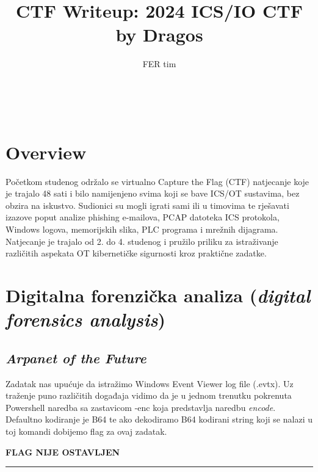 \documentclass{article}
\title{CTF Writeup: \textbf{2024 ICS/IO CTF by Dragos}}
\author{FER tim}
\begin{document}
\begin{center}
    \vspace*{\fill}
    {\LARGE\bf\thetitle}\\[1.5em]
    {\large\theauthor}
    \vspace*{\fill}
\end{center}

\newpage
\tableofcontents
\newpage

\section{Overview}
\label{sec:overview}
Početkom studenog održalo se virtualno Capture the Flag (CTF) natjecanje koje je trajalo 48 sati i 
bilo namijenjeno svima koji se bave ICS/OT sustavima, bez obzira na iskustvo. Sudionici su mogli igrati sami 
ili u timovima te rješavati izazove poput analize phishing e-mailova, PCAP datoteka ICS protokola, Windows logova, 
memorijskih slika, PLC programa i mrežnih dijagrama. Natjecanje je trajalo od 2. do 4. studenog i pružilo priliku za 
istraživanje različitih aspekata OT kibernetičke sigurnosti kroz praktične zadatke.


\section{Digitalna forenzička analiza (\textit{digital forensics analysis})}
\label{sec:forensics}
\subsection{\textit{Arpanet of the Future}}
Zadatak nas upućuje da istražimo Windows Event Viewer log file (.evtx). Uz traženje puno različitih događaja vidimo
da je u jednom trenutku pokrenuta Powershell naredba sa zastavicom -enc koja predstavlja naredbu \textit{encode}.
Defaultno kodiranje je B64 te ako dekodiramo B64 kodirani string koji se nalazi u toj komandi dobijemo flag za ovaj zadatak.
\newline
\newline
\begin{center}
    \textbf{FLAG NIJE OSTAVLJEN}    
\end{center}
\noindent\rule{\textwidth}{0.4pt}
\end{document}
